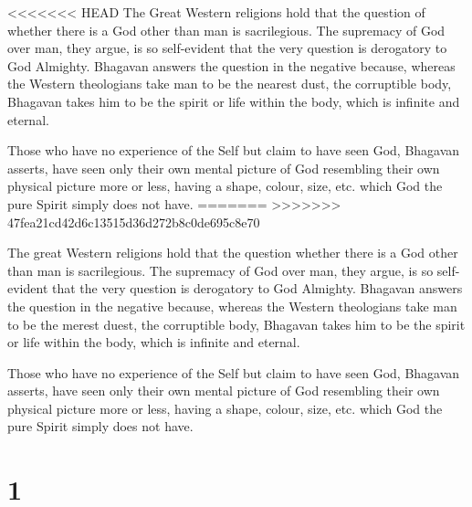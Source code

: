 \documentclass[12pt]{report}
\begin{document}
<<<<<<< HEAD
The Great Western religions hold that the question of whether there is
a God other than man is sacrilegious. The supremacy of God over man,
they argue, is so self-evident that the very question is derogatory to
God Almighty. Bhagavan answers the question in the negative because,
whereas the Western theologians take man to be the nearest dust, the
corruptible body, Bhagavan takes him to be the spirit or life within
the body, which is infinite and eternal.

Those who have no experience of the Self but claim to have seen God,
Bhagavan asserts, have seen only their own mental picture of God
resembling their own physical picture more or less, having a shape,
colour, size, etc. which God the pure Spirit simply does not have.
=======
>>>>>>> 47fea21cd42d6c13515d36d272b8c0de695c8e70

The great Western religions hold that the question whether there is a
God other than man is sacrilegious. The supremacy of God over man,
they argue, is so self-evident that the very question is derogatory to
God Almighty. Bhagavan answers the question in the negative because,
whereas the Western theologians take man to be the merest duest, the
corruptible body, Bhagavan takes him to be the spirit or life within
the body, which is infinite and eternal.

Those who have no experience of the Self but claim to have seen God,
Bhagavan asserts, have seen only their own mental picture of God
resembling their own physical picture more or less, having a shape,
colour, size, etc. which God the pure Spirit simply does not have.


\section{}

\begin{quote}

\end{quote}


\section{1}

\begin{quote}

\end{quote}

\end{document}
